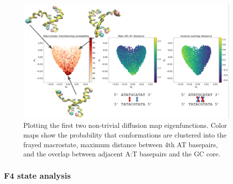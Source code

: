 \documentclass[journal=jpcbfk,manuscript=article]{achemso}
\begin{document}
\begin{figure}[ht!]
	\begin{center}
        \includegraphics[width=\textwidth]{Figs/figs_imp/GC-core_dmaps.png}
        \caption{Plotting the first two non-trivial diffusion map eigenfunctions. Color maps show the probability that conformations are clustered into the frayed macrostate, maximum distance between 4th AT basepairs, and the overlap between adjacent A:T basepairs and the GC core.}
        \label{fig:GC-core_dmaps}
	\end{center}
\end{figure}


\subsubsection{F4 state analysis}  %
\end{document}
